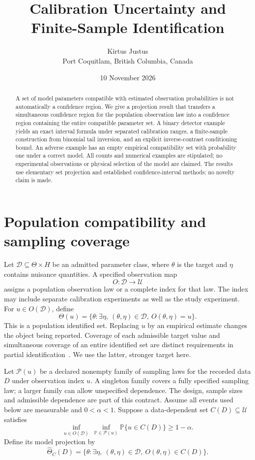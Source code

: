 \documentclass[11pt]{article}
\title{Calibration Uncertainty and\\Finite-Sample Identification}
\author{Kirtus Justus\\\small Port Coquitlam, British Columbia, Canada}
\date{10 November 2026}
\begin{document}
\maketitle
\begin{abstract}
A set of model parameters compatible with estimated observation probabilities is not automatically a confidence region. We give a projection result that transfers a simultaneous confidence region for the population observation law into a confidence region containing the entire compatible parameter set. A binary detector example yields an exact interval formula under separated calibration ranges, a finite-sample construction from binomial tail inversion, and an explicit inverse-contrast conditioning bound. An adverse example has an empty empirical compatibility set with probability one under a correct model. All counts and numerical examples are stipulated; no experimental observations or physical selection of the model are claimed. The results use elementary set projection and established confidence-interval methods; no novelty claim is made.
\end{abstract}

\section{Population compatibility and sampling coverage}

Let $\mathcal D\subseteq\Theta\times H$ be an admitted parameter class, where $\theta$ is the target and $\eta$ contains nuisance quantities. A specified observation map
\[
 O:\mathcal D\longrightarrow\mathcal U
\]
assigns a population observation law or a complete index for that law. The index may include separate calibration experiments as well as the study experiment. For $u\in O(\mathcal D)$, define
\[
 \Theta(u)=\{\theta:\exists\eta,\ (\theta,\eta)\in\mathcal D,
                   \ O(\theta,\eta)=u\}.
\]
This is a population identified set. Replacing $u$ by an empirical estimate changes the object being reported. Coverage of each admissible target value and simultaneous coverage of an entire identified set are distinct requirements in partial identification~\cite{imbensmanski}. We use the latter, stronger target here.

Let $\mathcal P(u)$ be a declared nonempty family of sampling laws for the recorded data $D$ under observation index $u$. A singleton family covers a fully specified sampling law; a larger family can allow unspecified dependence. The design, sample sizes and admissible dependence are part of this contract. Assume all events used below are measurable and $0<\alpha<1$. Suppose a data-dependent set $C(D)\subseteq\mathcal U$ satisfies
\begin{equation}
 \inf_{u\in O(\mathcal D)}\ \inf_{\mathbb P\in\mathcal P(u)}\mathbb P\{u\in C(D)\}\ge 1-\alpha.
 \label{eq:lawcoverage}
\end{equation}
Define its model projection by
\begin{equation}
 \widehat\Theta_C(D)=
 \{\theta:\exists\eta,\ (\theta,\eta)\in\mathcal D,
                  \ O(\theta,\eta)\in C(D)\}.
 \label{eq:projection}
\end{equation}
\end{document}
